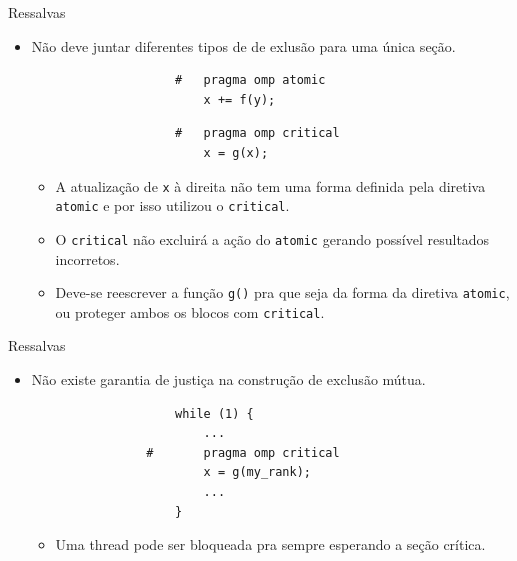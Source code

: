 	\begin{frame}[fragile]{Ressalvas}
		\begin{itemize}
			\item Não deve juntar diferentes tipos de de exlusão para uma única seção.
			\begin{multicols}{2}
				\begin{verbatim}
					#	pragma omp atomic
						x += f(y);
				\end{verbatim}
			\columnbreak
				\begin{verbatim}
					#	pragma omp critical
						x = g(x);
				\end{verbatim}
			\end{multicols}
			\begin{itemize}
				\item A atualização de {\tt x} à direita não tem uma forma definida pela diretiva {\tt atomic} e por isso utilizou o {\tt critical}.
				\item O {\tt critical} não excluirá a ação do {\tt atomic} gerando possível resultados incorretos.
				\item Deve-se reescrever a função {\tt g()} pra que seja da forma da diretiva {\tt atomic}, ou proteger ambos os blocos com {\tt critical}.
			\end{itemize}
		\end{itemize}
\end{frame}

	\begin{frame}[fragile]{Ressalvas}
		\begin{itemize}
			\item Não existe garantia de justiça na construção de exclusão mútua.
			\begin{verbatim}
					while (1) {
						...
				#		pragma omp critical
						x = g(my_rank);
						...
					}
			\end{verbatim}
			\begin{itemize}
				\item Uma thread pode ser bloqueada pra sempre esperando a seção crítica.
			\end{itemize}
		\end{itemize}
\end{frame}

